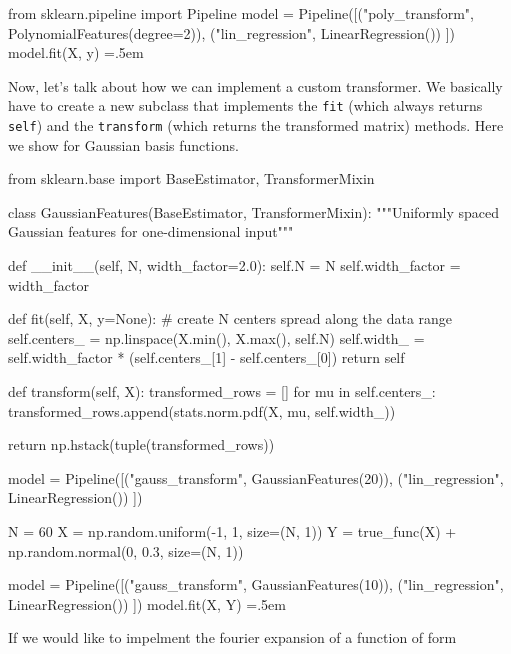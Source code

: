 \documentclass{article}
\theoremstyle{definition}
\newenvironment{cverbatim}
    {\SaveVerbatim{cverb}}
    {\endSaveVerbatim
    \flushleft\fboxrule=0pt\fboxsep=.5em
    \colorbox{cverbbg}{%
      \makebox[\dimexpr\linewidth-2\fboxsep][l]{\BUseVerbatim{cverb}}%
    }
    \endflushleft
  }
\begin{document}
    \begin{cverbatim}
    from sklearn.pipeline import Pipeline
    model = Pipeline([("poly_transform", PolynomialFeatures(degree=2)), 
                      ("lin_regression", LinearRegression())
                      ]) 
    model.fit(X, y)
    \end{cverbatim}

    Now, let's talk about how we can implement a custom transformer. We basically have to create a new subclass that implements the \texttt{fit} (which always returns \texttt{self}) and the \texttt{transform} (which returns the transformed matrix) methods. Here we show for Gaussian basis functions. 

    \begin{cverbatim}
    from sklearn.base import BaseEstimator, TransformerMixin

    class GaussianFeatures(BaseEstimator, TransformerMixin):
        """Uniformly spaced Gaussian features for one-dimensional input"""
        
        def __init__(self, N, width_factor=2.0):
            self.N = N
            self.width_factor = width_factor
            
        def fit(self, X, y=None):
            # create N centers spread along the data range
            self.centers_ = np.linspace(X.min(), X.max(), self.N)
            self.width_ = self.width_factor * (self.centers_[1] - self.centers_[0])
            return self
            
        def transform(self, X): 
            transformed_rows = []
            for mu in self.centers_: 
                transformed_rows.append(stats.norm.pdf(X, mu, self.width_))
            
            return np.hstack(tuple(transformed_rows))

    model = Pipeline([("gauss_transform", GaussianFeatures(20)), 
                      ("lin_regression", LinearRegression())
                      ]) 

    N = 60
    X = np.random.uniform(-1, 1, size=(N, 1)) 
    Y = true_func(X) + np.random.normal(0, 0.3, size=(N, 1)) 

    model = Pipeline([("gauss_transform", GaussianFeatures(10)), 
                  ("lin_regression", LinearRegression())
                  ]) 
    model.fit(X, Y)
    \end{cverbatim} 

    If we would like to impelment the fourier expansion of a function of form 
\end{document}
